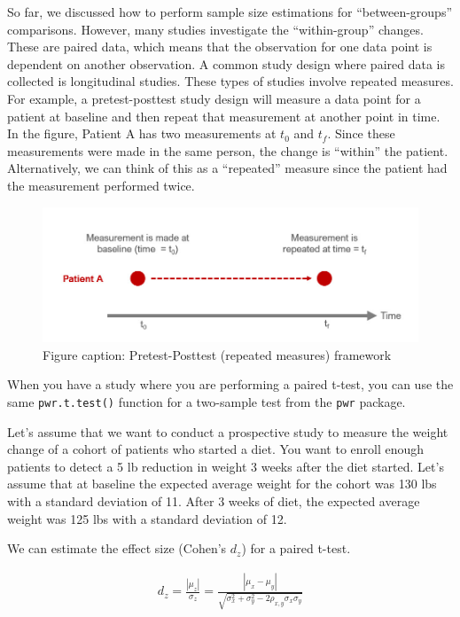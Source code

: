 \documentclass[
]{book}
\begin{document}
So far, we discussed how to perform sample size estimations for ``between-groups'' comparisons. However, many studies investigate the ``within-group'' changes. These are paired data, which means that the observation for one data point is dependent on another observation. A common study design where paired data is collected is longitudinal studies. These types of studies involve repeated measures. For example, a pretest-posttest study design will measure a data point for a patient at baseline and then repeat that measurement at another point in time. In the figure, Patient A has two measurements at \(t_{0}\) and \(t_{f}\). Since these measurements were made in the same person, the change is ``within'' the patient. Alternatively, we can think of this as a ``repeated'' measure since the patient had the measurement performed twice.

\begin{figure}
\includegraphics[width=1\linewidth]{img14/w14-BeforeAfter} \caption{Figure caption: Pretest-Posttest (repeated measures) framework}\label{fig:unnamed-chunk-239}
\end{figure}

When you have a study where you are performing a paired t-test, you can use the same \texttt{pwr.t.test()} function for a two-sample test from the \texttt{pwr} package.

Let's assume that we want to conduct a prospective study to measure the weight change of a cohort of patients who started a diet. You want to enroll enough patients to detect a 5 lb reduction in weight 3 weeks after the diet started. Let's assume that at baseline the expected average weight for the cohort was 130 lbs with a standard deviation of 11. After 3 weeks of diet, the expected average weight was 125 lbs with a standard deviation of 12.

We can estimate the effect size (Cohen's \(d_{z}\)) for a paired t-test.

\[
\begin{aligned}
d_{z} = \frac{ | \mu_{z} |}{\sigma_{z}} = \frac{| \mu_{x} - \mu_{y} | }{ \sqrt{\sigma_{x}^{2} + \sigma_{y}^{2} - 2 \rho_{x, y} \sigma_{x} \sigma_{y}}}
\end{aligned}
\]
\end{document}
